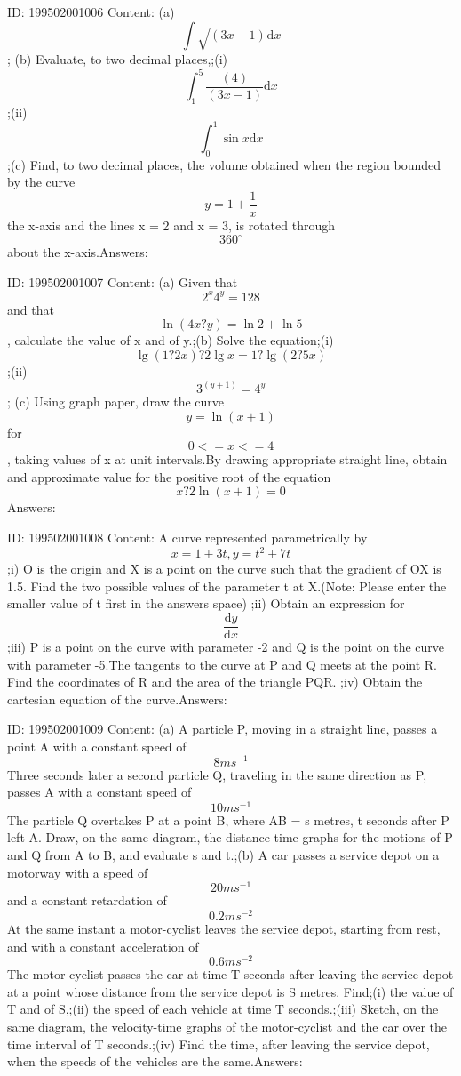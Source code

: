 \documentclass{article}
\begin{document}
ID: 199502001006
Content:
(a) \[\int\sqrt{\left (3x-1  \right )}\mathrm{d} x\]; (b) Evaluate, to two decimal places,;(i) \[\int_{1}^{5}\frac{\left ( 4 \right )}{\left ( 3x-1 \right )}\mathrm{d} x\];(ii) \[\int_{0}^{1}\sin x\mathrm{d} x\];(c) Find, to two decimal places, the volume obtained when the region bounded by the curve \[y=1+\frac{1}{x}\] the x-axis and the lines x = 2  and x = 3, is rotated through \[360^{\circ}\] about the x-axis.Answers:

ID: 199502001007
Content:
(a) Given that \[2^{x}4^{y}= 128\] and that \[\ln \left (  4x ? y\right )=\ln 2+\ln 5\], calculate the value of x and of y.;(b) Solve the equation;(i) \[\lg \left (  1 ? 2x\right )? 2\lg x= 1 ? \lg \left (2 ? 5x  \right )\];(ii)\[3^{\left ( y+1 \right )}=4^{y}\]; (c) Using graph paper, draw the curve \[y =\ln \left (  x + 1\right )\] for \[0<=x<=4\], taking values of x at unit intervals.By drawing appropriate straight line, obtain and approximate value for the positive root of the equation \[x ? 2\ln \left ( x + 1 \right )= 0\]Answers:

ID: 199502001008
Content:
A curve represented parametrically by  \[x = 1 + 3t, y = t^{2}+ 7t\] ;i) O is the origin and X is a point on the curve such that the gradient of OX is 1.5. Find the two possible values of the parameter t at X.(Note: Please enter the smaller value of t first in the answers space) ;ii) Obtain an expression for \[\frac{\mathrm{d}y }{\mathrm{d} x}\] ;iii) P is a point on the curve with parameter -2 and Q is the point on the curve with parameter -5.The tangents to the curve at P and Q meets at the point R. Find the coordinates of R and the area of the triangle PQR.  ;iv) Obtain the cartesian equation of the curve.Answers:

ID: 199502001009
Content:
(a)	A particle P, moving in a straight line, passes a point A with a constant speed of \[8 ms^{-1}\] Three seconds later a second particle Q, traveling in the same direction as P, passes A with a constant speed of \[10 ms^{-1}\] The particle Q overtakes P at a point B, where AB = s metres, t seconds after P left A. Draw, on the same diagram, the distance-time graphs for the motions of P and Q from A to B, and evaluate s and t.;(b)	A car passes a service depot on a motorway with a speed of \[20 ms^{-1}\]  and a constant retardation of \[0.2 ms^{-2}\] At the same instant a motor-cyclist leaves the service depot, starting from rest, and with a constant acceleration of \[0.6 ms^{-2}\] The motor-cyclist passes the car at time T seconds after leaving the service depot at a point whose distance from the service depot is S metres. Find;(i) the value of T and of S,;(ii) the speed of each vehicle at time T seconds.;(iii) Sketch, on the same diagram, the velocity-time graphs of the motor-cyclist and the car over the time interval of T seconds.;(iv)	Find the time, after leaving the service depot, when the speeds of the vehicles are the same.Answers:
\end{document}
